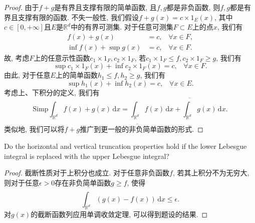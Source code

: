 \documentclass[reqno,a4paper,10pt]{amsart}
\newcommand\dif{\,\mathrm{d}}
\newcommand\Rnum{\mathbb{R}}
\begin{document}
\begin{proof}
    由于$f+g$是有界且支撑有限的简单函数, 且$f,g$都是非负函数, 则$f,g$都是有界且支撑有限的函数. 不失一般性, 我们假设$f+g(x)=c\times 1_E(x)$, 其中$c\in[0,+\infty]$且$E$是$\Rnum^d$中的有界可测集. 对于任意可测集$F\subset E$上的点$x$, 我们有
    \begin{equation*}
        \begin{split}
            f(x)+g(x)&=c, \;\;\;\forall x\in F,\\
            \inf f(x)+\sup g(x)&=c, \;\;\;\forall x\in F. 
        \end{split}
    \end{equation*}
    故, 考虑$F$上的任意示性函数$c_1\times 1_F,c_2\times 1_F$, 若$c_1\times 1_F\leq f, c_2\times 1_F\geq g$, 我们有
    \begin{equation*}
        \sup c_1\times 1_F(x)+\inf c_2\times 1_F(x)=c,\;\;\; \forall x\in F.
    \end{equation*}
    由此, 对于任意$E$上的简单函数$h_1\leq f, h_2\geq g$, 我们有
    \begin{equation*}
        \sup h_1(x)+\inf h_2(x)=c,\;\;\; \forall x\in E.
    \end{equation*}
    考虑上、下积分的定义, 我们有
    \begin{equation*}
        \mathrm{Simp}\int_{\Rnum^d} f(x)+g(x)\dif x=\underline{\int_{\Rnum^d}}f(x)\dif x+\overline{\int_{\Rnum^d}}g(x)\dif x.
    \end{equation*}
    类似地, 我们可以将$f+g$推广到更一般的非负简单函数的形式.
\end{proof}
Do the horizontal and vertical truncation properties hold if the lower Lebesgue integral is replaced with the upper Lebesgue integral?
\begin{proof}
    截断性质对于上积分也成立. 对于任意非负函数$f$, 若其上积分不为无穷大, 则对于任意$\epsilon>0$存在非负简单函数$g\geq f$, 使得
    \begin{equation}
        \overline{\int_{\Rnum^d}} (g(x)-f(x))\dif x\leq \epsilon.
    \end{equation}
    对$g(x)$的截断函数列应用单调收敛定理, 可以得到题设的结果.
\end{proof}
\end{document}
